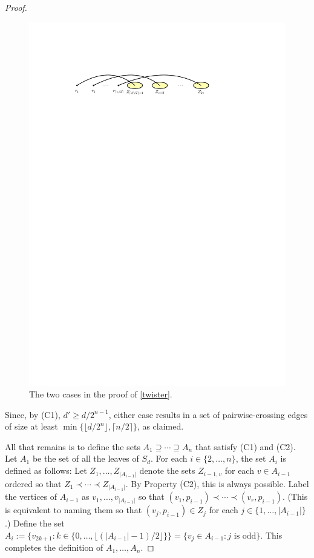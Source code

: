 \documentclass[kpfonts]{patmorin}
\renewcommand{\ge}{\geqslant}
\begin{document}
\begin{proof}
\begin{figure}[!h]
			\includegraphics{figs/median-2}
		\caption{The two cases in the proof of \cref{twister}.}
	\end{figure}
	Since, by (C1), $d'\ge d/2^{n-1}$, either case results in a set of pairwise-crossing edges of size at least $\min\{\lfloor d/2^n\rfloor,\lceil n/2\rceil\}$, as claimed.

    All that remains is to define the sets $A_1\supseteq\cdots\supseteq A_n$ that satisfy (C1) and (C2).  Let $A_1$ be the set of all the leaves of $S_d$.  For each $i\in\{2,\ldots,n\}$, the set $A_i$ is defined as follows:  Let $Z_1,\ldots,Z_{|A_{i-1}|}$ denote the sets $Z_{i-1, v}$ for each $v\in A_{i-1}$ ordered so that $Z_1\prec\cdots\prec Z_{|A_{i-1}|}$. By Property (C2), this is always possible.	Label the vertices of $A_{i-1}$ as $v_1,\ldots,v_{|A_{i-1}|}$ so that $(v_1,p_{i-1})\prec\cdots\prec (v_r,p_{i-1})$.   (This is equivalent to naming them so that $(v_j,p_{i-1})\in Z_j$ for each $j\in\{1,\ldots,|A_{i-1}|\}$.)  Define the set $A_i:=\{v_{2k+1}:k\in\{0,\ldots,\lfloor(|A_{i-1}|-1)/2\rfloor\}\}=\{v_{j}\in A_{i-1}:\text{$j$ is odd}\}$.  This completes the definition of $A_1,\ldots,A_n$.


\end{proof}
\end{document}
